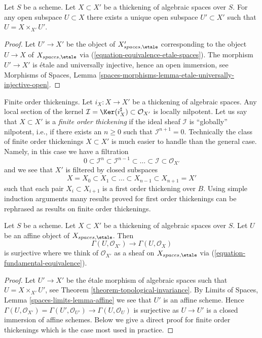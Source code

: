 \begin{lemma}
\label{lemma-open-subspace-thickening}
Let $S$ be a scheme. Let $X \subset X'$ be a thickening
of algebraic spaces over $S$. For any open subspace $U \subset X$ there
exists a unique open subspace $U' \subset X'$ such that
$U = X \times_{X'} U'$.
\end{lemma}

\begin{proof}
Let $U' \to X'$ be the object of $X'_{spaces, \etale}$
corresponding to the object $U \to X$ of $X_{spaces, \etale}$
via (\ref{equation-equivalence-etale-spaces}). The morphism
$U' \to X'$ is \'etale and universally injective, hence an open immersion, see
Morphisms of Spaces,
Lemma \ref{spaces-morphisms-lemma-etale-universally-injective-open}.
\end{proof}

\noindent
Finite order thickenings. Let $i_X : X \to X'$ be a thickening of
algebraic spaces. Any local section of the kernel
$\mathcal{I} = \Ker(i_X^\sharp) \subset \mathcal{O}_{X'}$ is
locally nilpotent.
Let us say that $X \subset X'$ is a {\it finite order thickening}
if the ideal sheaf $\mathcal{I}$ is ``globally'' nilpotent, i.e.,
if there exists an $n \geq 0$ such that $\mathcal{I}^{n + 1} = 0$.
Technically the class of finite order thickenings $X \subset X'$
is much easier to handle than the general case.
Namely, in this case we have a filtration
$$
0 \subset \mathcal{I}^n \subset \mathcal{I}^{n - 1} \subset
\ldots \subset \mathcal{I} \subset \mathcal{O}_{X'}
$$
and we see that $X'$ is filtered by closed subspaces
$$
X = X_0 \subset X_1 \subset \ldots \subset X_{n - 1} \subset X_{n + 1} = X'
$$
such that each pair $X_i \subset X_{i + 1}$ is a first order thickening
over $B$. Using simple induction arguments many results proved for first order
thickenings can be rephrased as results on finite order thickenings.

\begin{lemma}
\label{lemma-first-order-thickening-surjective}
Let $S$ be a scheme. Let $X \subset X'$ be a thickening
of algebraic spaces over $S$. Let $U$ be an affine object of
$X_{spaces, \etale}$. Then
$$
\Gamma(U, \mathcal{O}_{X'}) \to \Gamma(U, \mathcal{O}_X)
$$
is surjective where we think of $\mathcal{O}_{X'}$ as a sheaf on
$X_{spaces, \etale}$ via (\ref{equation-fundamental-equivalence}).
\end{lemma}

\begin{proof}
Let $U' \to X'$ be the \'etale morphism of algebraic spaces such that
$U = X \times_{X'} U'$, see Theorem \ref{theorem-topological-invariance}.
By Limits of Spaces, Lemma \ref{spaces-limits-lemma-affine} we see
that $U'$ is an affine scheme. Hence
$\Gamma(U, \mathcal{O}_{X'}) = \Gamma(U', \mathcal{O}_{U'}) \to
\Gamma(U, \mathcal{O}_U)$
is surjective as $U \to U'$ is a closed immersion of affine schemes.
Below we give a direct proof for finite order thickenings
which is the case most used in practice.
\end{proof}

